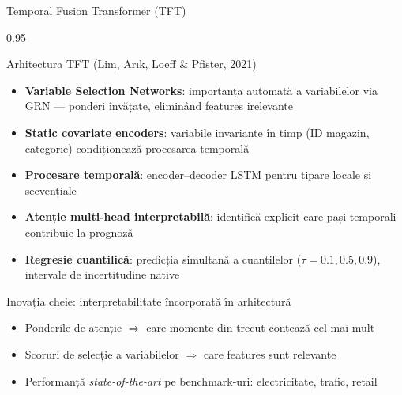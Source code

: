 \documentclass[9pt, aspectratio=169, t]{beamer}
\begin{document}
\begin{frame}{Temporal Fusion Transformer (TFT)}
    \vspace{-2mm}
    \begin{cminipage}{0.95\textwidth}
        {\scriptsize
        \begin{block}{Arhitectura TFT (Lim, Ar{\i}k, Loeff \& Pfister, 2021)}
            \begin{itemize}\setlength{\itemsep}{0pt}
                \item \textbf{Variable Selection Networks}: importanța automată a variabilelor via GRN --- ponderi învățate, eliminând features irelevante
                \item \textbf{Static covariate encoders}: variabile invariante în timp (ID magazin, categorie) condiționează procesarea temporală
                \item \textbf{Procesare temporală}: encoder--decoder LSTM pentru tipare locale și secvențiale
                \item \textbf{Atenție multi-head interpretabilă}: identifică explicit care pași temporali contribuie la prognoză
                \item \textbf{Regresie cuantilică}: predicția simultană a cuantilelor ($\tau = 0.1, 0.5, 0.9$), intervale de incertitudine native
            \end{itemize}
        \end{block}
        \vspace{-2mm}
        \begin{exampleblock}{Inovația cheie: interpretabilitate încorporată în arhitectură}
            \begin{itemize}\setlength{\itemsep}{0pt}
                \item Ponderile de atenție $\Rightarrow$ care momente din trecut contează cel mai mult
                \item Scoruri de selecție a variabilelor $\Rightarrow$ care features sunt relevante
                \item Performanță \emph{state-of-the-art} pe benchmark-uri: electricitate, trafic, retail
            \end{itemize}
        \end{exampleblock}
        }
    \end{cminipage}
\end{frame}
\end{document}

